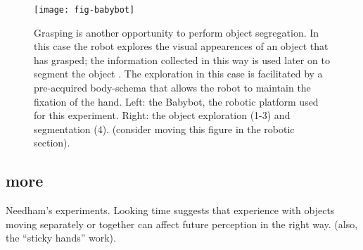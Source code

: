 \begin{figure}[t]

\centerline{
\texttt{[image: fig-babybot]}
}

\caption{
%
Grasping is another opportunity to perform object segregation. In this case the robot explores the visual appearences of an object that has grasped; the information collected in this way is used later on to segment the object \cite{natale05exploring}. The exploration in this case is facilitated by a pre-acquired body-schema that allows the robot to maintain the fixation of the hand. Left: the Babybot, the robotic platform used for this experiment. Right: the object exploration (1-3) and segmentation (4). (consider moving this figure in the robotic section). 
%
}

\label{fig:babybot}

\end{figure}

\subsection{more}

Needham's experiments. 
\cite{needham01object,needham97object}
Looking time suggests that experience with objects moving separately
or together can affect future perception in the right way.
(also, the ``sticky hands'' work).
